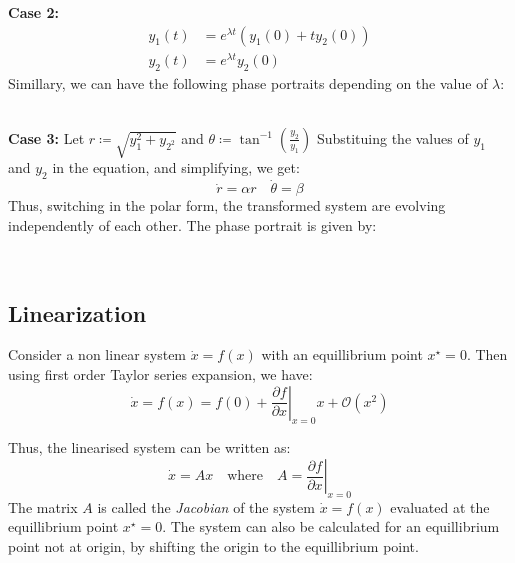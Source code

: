 % 
% 
\medskip
\textbf{Case 2:}
\[
    \begin{aligned}
        y_1(t) &= e^{\lambda t} \left(   y_1(0) + t y_2(0)  \right)\\
        y_2(t) &= e^{\lambda t} y_2(0)
    \end{aligned}
\]
Simillary, we can have the following phase portraits depending on the value of \(\lambda\):\\
\medskip%
\begin{minipage}
    {0.5\textwidth}
    
\end{minipage}
\begin{minipage}
    {0.5\textwidth}
    
\end{minipage}\\
\medskip%
\textbf{Case 3:} Let \( r\coloneqq \sqrt{y_1 ^{2} + y_{2^{2} }  } \) and \(\theta \coloneqq \tan ^{-1}  \left( \frac{y_2}{y_1}  \right) \)
Substituing the values of \(y_1\) and \(y_2\) in the equation, and simplifying, we get:
\[
    \dot{r} = \alpha r \quad \dot{\theta} = \beta 
\]
Thus, switching in the polar form, the transformed system are evolving independently of each other.
The phase portrait is given by:\\
\medskip%
\begin{minipage}
    {0.5\textwidth}
    
\end{minipage}
\begin{minipage}
    {0.5\textwidth}
    
\end{minipage}\\

\subsection{Linearization}

Consider a non linear system \(\dot{x} = f(x)\) with an equillibrium point \(x^{\star} = 0\).
Then using first order Taylor series expansion, we have:
\[
    \dot{x} = f(x) = f(0) + \left . \frac{\partial f}{\partial x} \right |_{x=0} x + \mathcal{O}(x^2)
\]

Thus, the linearised system can be written as:
\[
    \dot{x} = A x \quad \text{where} \quad A = \left . \frac{\partial f}{\partial x} \right |_{x=0}
\]
The matrix \(A\) is called the \emph{Jacobian} of the system \(\dot{x} = f(x)\) evaluated at the
equillibrium point \(x^{\star} = 0\). The system can also be calculated for an equillibrium point
not at origin, by shifting the origin to the equillibrium point.
    
